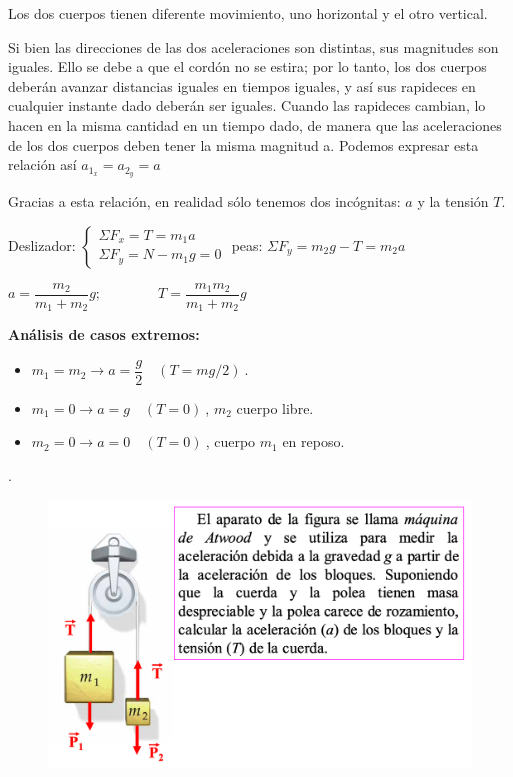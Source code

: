 \small{Los dos cuerpos tienen diferente movimiento, uno horizontal y el otro vertical.}

\small{Si bien las direcciones de las dos aceleraciones son distintas, sus magnitudes son iguales. Ello se debe a que el cordón no se estira; por lo tanto, los dos cuerpos deberán avanzar distancias iguales en tiempos iguales, y así sus rapideces en cualquier instante dado deberán ser iguales. Cuando las rapideces cambian, lo hacen en la misma cantidad en un tiempo dado, de manera que las aceleraciones de los dos cuerpos deben tener la misma magnitud a. Podemos expresar esta relación así $a_{1_x}=a_{2_y}=a$}

\small{Gracias a esta relación, en realidad sólo tenemos dos incógnitas: $a$ y la tensión $T$}\normalsize{.}

Deslizador: $\begin{cases} \Sigma F_x=T=m_1 a \\ \Sigma F_y=N-m_1g=0 \end{cases}$ peas: $\Sigma F_y=m_2 g-T=m_2 a$

$a=\dfrac {m_2}{m_1+m_2}g;\qquad \qquad T=\dfrac {m_1 m_2}{m_1+m_2}g$


\vspace{4mm}\textbf{Análisis de casos extremos:}
\begin{itemize}
\item $m_1=m_2 \to a=\dfrac g 2 \quad (T=mg/2)\ $.
\item $m_1=0 \to a=g \quad (T=0)\ $, $m_2$ cuerpo libre.
\item $m_2=0 \to a=0 \quad (T=0)\ $, cuerpo $m_1$ en reposo.	
\end{itemize}


\begin{prob}.
	\begin{figure}[H]
	\centering
	\includegraphics[width=1\textwidth]{imagenes/imagenes03/T03IM22.png}
	\end{figure}
\end{prob}

